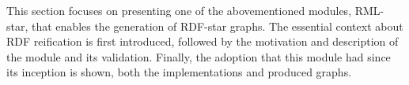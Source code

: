 This section focuses on presenting one of the abovementioned modules, RML-star, that enables the generation of RDF-star graphs.  The essential context about RDF reification is first introduced, followed by the motivation and description of the module and its validation. Finally, the adoption that this module had since its inception is shown, both the implementations and produced graphs. 










